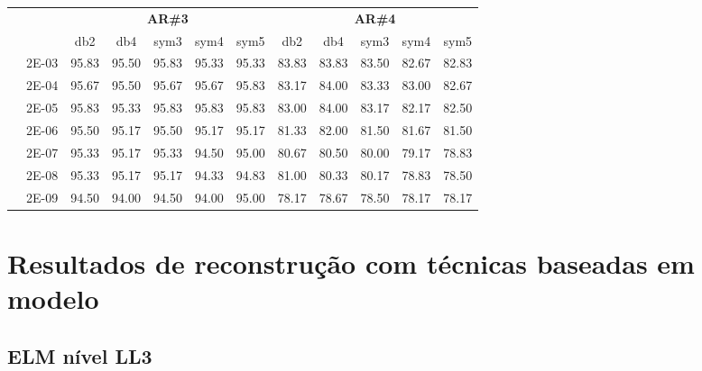 \begin{table}[H]
\begin{tabular}{|c|c|c c c c c|c c c c c|}
\cline{3-12}
\multicolumn{2}{c}{} & \multicolumn{5}{|c|}{\textbf{AR\#3}}  & \multicolumn{5}{c|}{\textbf{AR\#4}} \\\cline{3-12}
\multicolumn{2}{c}{}  & \multicolumn{1}{|c}{db2} & db4 & sym3 & sym4 & sym5 & db2 & db4& sym3 & sym4 & sym5 \\\hline
\multicolumn{1}{|c|}{ \multirow{6}{*}{\rotatebox[origin=c]{90}{\textbf{Gamma}}} }
&2E-03&	95.83&	95.50&	95.83&	95.33&	95.33&	83.83&	83.83&	83.50&	82.67&	82.83	\\\cline{2-12}
&2E-04&	95.67&	95.50&	95.67&	95.67&	95.83&	83.17&	84.00&	83.33&	83.00&	82.67	\\\cline{2-12}
&2E-05&	95.83&	95.33&	95.83&	95.83&	95.83&	83.00&	84.00&	83.17&	82.17&	82.50	\\\cline{2-12}
&2E-06&	95.50&	95.17&	95.50&	95.17&	95.17&	81.33&	82.00&	81.50&	81.67&	81.50	\\\cline{2-12}
&2E-07&	95.33&	95.17&	95.33&	94.50&	95.00&	80.67&	80.50&	80.00&	79.17&	78.83	\\\cline{2-12}
&2E-08&	95.33&	95.17&	95.17&	94.33&	94.83&	81.00&	80.33&	80.17&	78.83&	78.50	\\\cline{2-12}
&2E-09&	94.50&	94.00&	94.50&	94.00&	95.00&	78.17&	78.67&	78.50&	78.17&	78.17	

	

	
\\\midrule
\end{tabular}

\end{table}







\section{Resultados de reconstrução com técnicas baseadas em modelo}

\subsection{ELM nível LL3}

